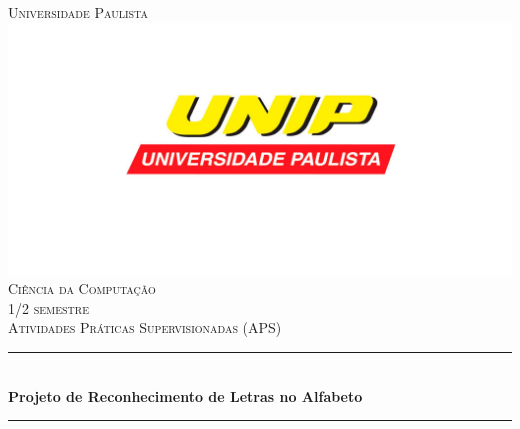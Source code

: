 \documentclass[12pt]{article}
\begin{document}
\begin{titlepage}

\newcommand{\HRule}{\rule{\linewidth}{0.5mm}} %

\center %


\textsc{\LARGE Universidade Paulista}\\[1.5cm] %
\includegraphics[scale=.3]{unip.jpg}\\[1cm] %
\textsc{\Large Ciência da Computação}\\[0.5cm] %
\textsc{\large 1/2 semestre}\\[0.5cm] %
\textsc{\Large Atividades Práticas Supervisionadas (APS)}\\[0.5cm] %

\HRule \\[0.4cm]
{ \Large \bfseries Projeto de Reconhecimento de Letras no Alfabeto}\\[0.4cm] %
\HRule \\[1.5cm]



\end{titlepage}
\end{document}
